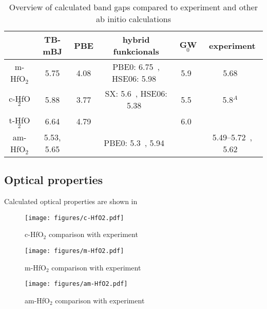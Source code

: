 \documentclass[10pt,a4paper,twocolumn]{article}
\begin{document}
\begin{table*}
\begin{center}

\begin{tabular}{c|ccccc}
			& TB-mBJ & PBE & hybrid funkcionals & GW$_0$ & experiment \\
\hline
m-HfO$_2$ &	5.75 & 4.08 & PBE0: 6.75~\cite{Komsa2010}, HSE06: 5.98~\cite{Komsa2010} & 5.9~\cite{Gruning2010} & 5.68~\cite{Balog1977} \\
c-HfO$_2$ &	5.88 & 3.77 & SX: 5.6~\cite{Clark2010}, HSE06: 5.38~\cite{Yang2014} & 5.5~\cite{Gruning2010} & 5.8$^A$~\cite{Lim2002}\\
t-HfO$_2$ &	6.64 & 4.79 &  & 6.0~\cite{Gruning2010} & \\
am-HfO$_2$ & 5.53, 5.65 & & PBE0: 5.3~\cite{Broqvist2007}, 5.94~\cite{Chen2011} &  & 5.49--5.72~\cite{Takeuchi2004}, 5.62~\cite{Nguyen2005}\\

\end{tabular}
\caption{Overview of calculated band gaps compared to experiment and other ab initio calculations}
\label{gaps}
\end{center}
\end{table*}

\subsection{Optical properties}

Calculated optical properties are shown in 

\begin{figure}
\begin{center}
	\texttt{[image: figures/c-HfO2.pdf]}
	\caption{c-HfO$_2$ comparison with experiment}
\end{center}
\end{figure}

\begin{figure}
\begin{center}
	\texttt{[image: figures/m-HfO2.pdf]}
	\caption{m-HfO$_2$ comparison with experiment}
\end{center}
\end{figure}

\begin{figure}
\begin{center}
	\texttt{[image: figures/am-HfO2.pdf]}
	\caption{am-HfO$_2$ comparison with experiment}
\end{center}
\end{figure}
\end{document}
